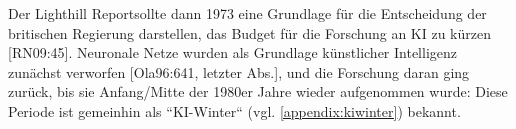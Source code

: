 Der Lighthill Report\footnotemark[41] sollte dann 1973 eine Grundlage für die Entscheidung der britischen Regierung darstellen, das Budget für die Forschung an KI zu kürzen [RN09:45]. Neuronale Netze wurden als Grundlage künstlicher Intelligenz zunächst verworfen [Ola96:641, letzter Abs.], und die Forschung daran ging zurück, bis sie Anfang/Mitte der 1980er Jahre wieder aufgenommen wurde: Diese Periode ist gemeinhin als ``KI-Winter`` (vgl. \ref{appendix:kiwinter}) bekannt.


